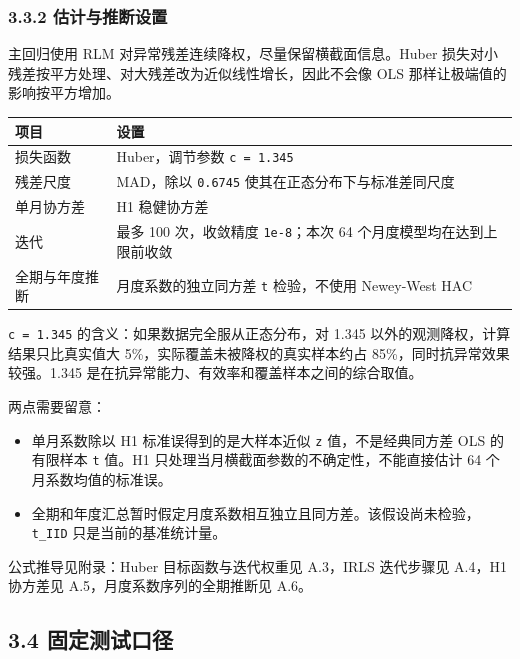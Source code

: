 \documentclass[UTF8,a4paper,11pt]{ctexart}
\begin{document}
\subsubsection*{3.3.2 估计与推断设置}

主回归使用 RLM 对异常残差连续降权，尽量保留横截面信息。Huber 损失对小残差按平方处理、对大残差改为近似线性增长，因此不会像 OLS 那样让极端值的影响按平方增加。

\begin{table}[htbp]
\centering
\begin{tabularx}{\textwidth}{@{}YY@{}}
\toprule
项目 & 设置 \\
\midrule
损失函数 & Huber，调节参数 \texttt{c = 1.345} \\
残差尺度 & MAD，除以 \texttt{0.6745} 使其在正态分布下与标准差同尺度 \\
单月协方差 & H1 稳健协方差 \\
迭代 & 最多 100 次，收敛精度 \texttt{1e-8}；本次 64 个月度模型均在达到上限前收敛 \\
全期与年度推断 & 月度系数的独立同方差 \texttt{t} 检验，不使用 Newey-West HAC \\
\bottomrule
\end{tabularx}
\end{table}

\texttt{c = 1.345} 的含义：如果数据完全服从正态分布，对 1.345 以外的观测降权，计算结果只比真实值大 5\%，实际覆盖未被降权的真实样本约占 85\%，同时抗异常效果较强。1.345 是在抗异常能力、有效率和覆盖样本之间的综合取值。

两点需要留意：

\begin{itemize}[leftmargin=2em,itemsep=2pt,topsep=3pt]
\item 
单月系数除以 H1 标准误得到的是大样本近似 \texttt{z} 值，不是经典同方差 OLS 的有限样本 \texttt{t} 值。H1 只处理当月横截面参数的不确定性，不能直接估计 64 个月系数均值的标准误。

\item 
全期和年度汇总暂时假定月度系数相互独立且同方差。该假设尚未检验，\texttt{t\_IID} 只是当前的基准统计量。

\end{itemize}

公式推导见附录：Huber 目标函数与迭代权重见 A.3，IRLS 迭代步骤见 A.4，H1 协方差见 A.5，月度系数序列的全期推断见 A.6。

{}
\subsection*{3.4 固定测试口径}
\end{document}
